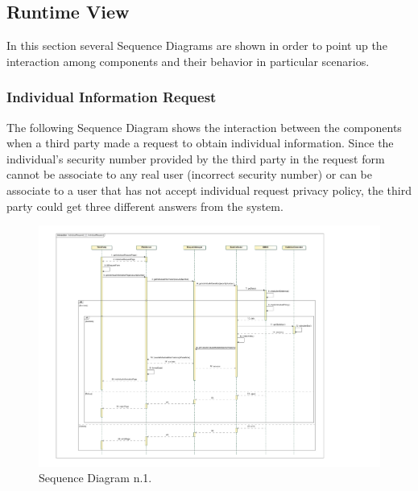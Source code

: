 \subsection{Runtime View}
In this section several Sequence Diagrams are shown in order to point up the interaction among components and their behavior in particular scenarios.
\newpage
\subsubsection{Individual Information Request}
The following Sequence Diagram shows the interaction between the components when a third party made a request to obtain individual information. Since the individual's security number provided by the third party in the request form cannot be associate to any real user (incorrect security number) or can be associate to a user that has not accept individual request privacy policy, the third party could get three different answers from the system.
\\[1.0cm]
\begin{figure}[H]
\centering
\includegraphics[scale=0.8, angle=0,origin=c]{Images/SequenceDiagrams/IndividualRequest.pdf}
\caption{Sequence Diagram n.1.}
\clearpage
\end{figure}
\newpage
